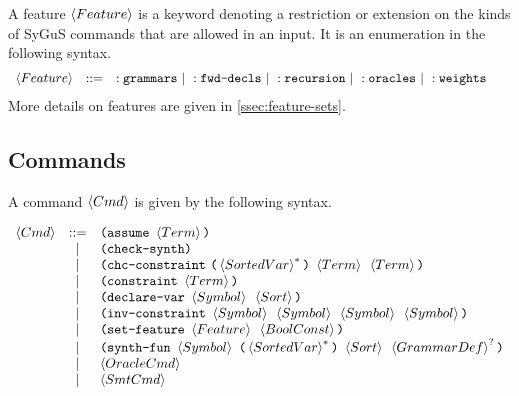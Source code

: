 \documentclass[english,a4paper,10pt]{article}
\begin{document}
A feature $\feature$ is a keyword denoting a restriction or extension
on the kinds of SyGuS commands that are allowed in an input.
It is an enumeration in the following syntax.
\begin{alignat*}{1}
 & \begin{array}{rcl}
 \feature & ::= & :\fgrammarskwd\mbox{ }|\mbox{ }:\ffwddeclskwd\mbox{ }|\mbox{ }:\frecursionkwd\mbox{ }|\mbox{ } :\foracleskwd\mbox{ }|\mbox{ } :\fweightskwd\mbox{ }
\end{array}
\end{alignat*}
More details on features are given in \cref{ssec:feature-sets}.

\subsection{Commands}

A command $\cmd$ is given by the following syntax.

\[
\begin{array}{rcl}
\cmd 
 & ::= & \paren{\assumekwd\mbox{ }\term} \\
 & | & \paren{\checksynthkwd} \\
 & | & \paren{\constraintchckwd\mbox{ }\paren{\kstar{\sortedvar}}\mbox{ }\term\mbox{ }\term} \\
 & | & \paren{\constraintkwd\mbox{ }\term} \\
 & | & \paren{\vardeclkwd\mbox{ }\symbol\mbox{ }\sortexpr}\\ 
 & | & \paren{\constraintinvkwd\mbox{ }\symbol\mbox{ }\symbol\mbox{ }\symbol\mbox{ }\symbol} \\
 & | & \paren{\setfeaturekwd\mbox{ }\feature\mbox{ }\boolconst} \\
 & | & \paren{\synthfunkwd\mbox{ }\symbol\mbox{ }\paren{\kstar{\sortedvar}}\mbox{ }\sortexpr\mbox{ }\koption{\grammardef}}\\
 & | & \oraclecmd \\
 & | & \smtcmd
\end{array}
\]
\end{document}
